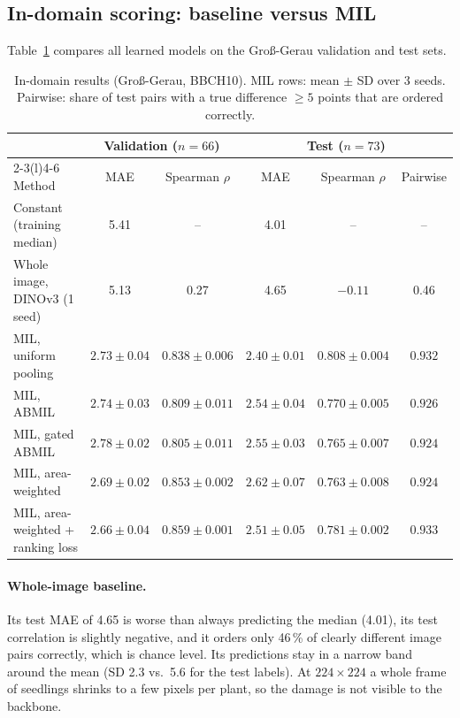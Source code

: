 \subsection{In-domain scoring: baseline versus MIL}
\label{sec:res-main}

Table~\ref{tab:main} compares all learned models on the Gro\ss-Gerau validation and test sets.

\begin{table}[tb]
\centering
\small
\caption{In-domain results (Gro\ss-Gerau, BBCH10). MIL rows: mean $\pm$ SD over 3 seeds. Pairwise:
share of test pairs with a true difference $\geq 5$ points that are ordered correctly.}
\label{tab:main}
\setlength{\tabcolsep}{4pt}
\begin{tabular}{@{}lccccc@{}}
\toprule
 & \multicolumn{2}{c}{Validation ($n=66$)} & \multicolumn{3}{c}{Test ($n=73$)} \\
\cmidrule(lr){2-3}\cmidrule(l){4-6}
Method & MAE & Spearman $\rho$ & MAE & Spearman $\rho$ & Pairwise \\
\midrule
Constant (training median)        & 5.41 & --    & 4.01 & --     & -- \\
Whole image, DINOv3 (1 seed)      & 5.13 & 0.27  & 4.65 & $-0.11$ & 0.46 \\
\midrule
MIL, uniform pooling              & $2.73 \pm 0.04$ & $0.838 \pm 0.006$ & $\mathbf{2.40} \pm 0.01$ & $\mathbf{0.808} \pm 0.004$ & $0.932$ \\
MIL, ABMIL                        & $2.74 \pm 0.03$ & $0.809 \pm 0.011$ & $2.54 \pm 0.04$ & $0.770 \pm 0.005$ & $0.926$ \\
MIL, gated ABMIL                  & $2.78 \pm 0.02$ & $0.805 \pm 0.011$ & $2.55 \pm 0.03$ & $0.765 \pm 0.007$ & $0.924$ \\
MIL, area-weighted                & $2.69 \pm 0.02$ & $0.853 \pm 0.002$ & $2.62 \pm 0.07$ & $0.763 \pm 0.008$ & $0.924$ \\
MIL, area-weighted + ranking loss & $\mathbf{2.66} \pm 0.04$ & $\mathbf{0.859} \pm 0.001$ & $2.51 \pm 0.05$ & $0.781 \pm 0.002$ & $\mathbf{0.933}$ \\
\bottomrule
\end{tabular}
\end{table}

\paragraph{Whole-image baseline.} Its test MAE of 4.65 is worse than
always predicting the median (4.01), its test correlation is slightly negative, and it orders
only 46\,\% of clearly different image pairs correctly, which is chance level. Its predictions
stay in a narrow band around the mean (SD 2.3 vs.\ 5.6 for the test labels). At $224\times224$ a whole
frame of seedlings shrinks to a few pixels per plant, so the
damage is not visible to the backbone.

